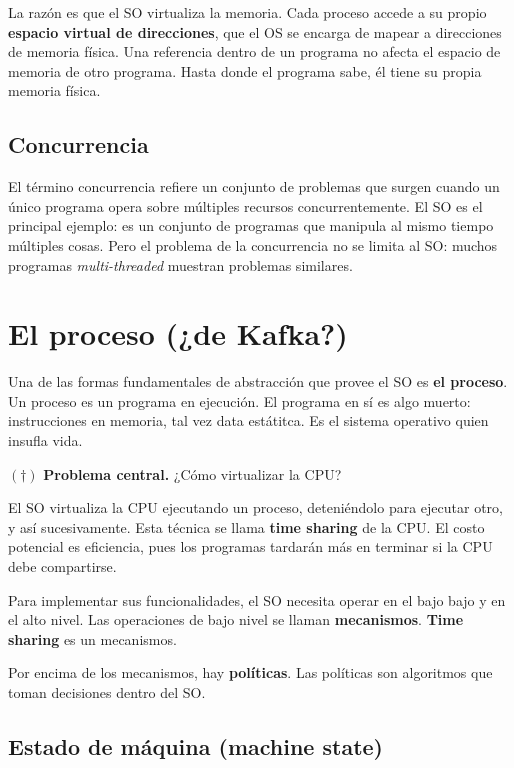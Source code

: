 \documentclass[12pt]{article}
\theoremstyle{definition}
\begin{document}
La razón es que el SO virtualiza la memoria. Cada proceso accede a su propio
\textbf{espacio virtual de direcciones}, que el OS se encarga de mapear a
direcciones de memoria física. Una referencia dentro de un programa no afecta el
espacio de memoria de otro programa. Hasta donde el programa sabe, él tiene su
propia memoria física. 

\subsection{Concurrencia}

El término concurrencia refiere un conjunto de problemas que surgen cuando
un único programa opera sobre múltiples recursos concurrentemente. El SO es el
principal ejemplo: es un conjunto de programas que manipula al mismo tiempo
múltiples cosas. Pero el problema de la concurrencia no se limita al SO: muchos
programas \textit{multi-threaded} muestran problemas similares.

\pagebreak

\section{El proceso (¿de Kafka?)}

Una de las formas fundamentales de abstracción que provee el SO es 
\textbf{el proceso}. Un proceso es un programa en ejecución. El programa en sí
es algo muerto: instrucciones en memoria, tal vez data estátitca. Es el sistema
operativo quien insufla vida.

\begin{shaded}
    $(\dagger)$ \textbf{Problema central.} ¿Cómo virtualizar la CPU?
\end{shaded}

El SO virtualiza la CPU ejecutando un proceso, deteniéndolo para ejecutar otro,
y así sucesivamente. Esta técnica se llama \textbf{time sharing} de la CPU. El
costo potencial es eficiencia, pues los programas tardarán más en terminar si la
CPU debe compartirse.

Para implementar sus funcionalidades, el SO necesita operar en el bajo bajo y
en el alto nivel. Las operaciones de bajo nivel se llaman \textbf{mecanismos}.
\textbf{Time sharing} es un mecanismos. 

Por encima de los mecanismos, hay \textbf{políticas}. Las políticas son
algoritmos que toman decisiones dentro del SO.

\subsection{Estado de máquina (machine state)}
\end{document}
